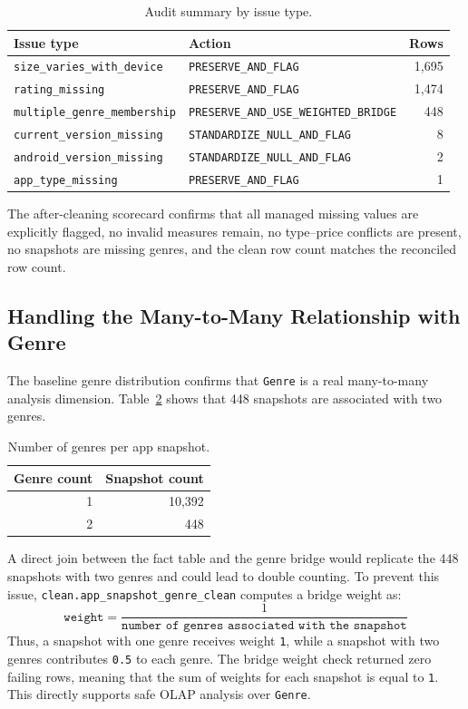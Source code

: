 \documentclass[11pt,a4paper]{article}
\begin{document}
\begin{table}[H]
\centering
\caption{Audit summary by issue type.}
\label{tab:audit_summary}
\begin{tabular}{@{}llr@{}}
\toprule
\textbf{Issue type} & \textbf{Action} & \textbf{Rows} \\
\midrule
\texttt{size\_varies\_with\_device} & \texttt{PRESERVE\_AND\_FLAG} & 1,695 \\
\texttt{rating\_missing} & \texttt{PRESERVE\_AND\_FLAG} & 1,474 \\
\texttt{multiple\_genre\_membership} & \texttt{PRESERVE\_AND\_USE\_WEIGHTED\_BRIDGE} & 448 \\
\texttt{current\_version\_missing} & \texttt{STANDARDIZE\_NULL\_AND\_FLAG} & 8 \\
\texttt{android\_version\_missing} & \texttt{STANDARDIZE\_NULL\_AND\_FLAG} & 2 \\
\texttt{app\_type\_missing} & \texttt{PRESERVE\_AND\_FLAG} & 1 \\
\bottomrule
\end{tabular}
\end{table}

The after-cleaning scorecard confirms that all managed missing values are explicitly flagged, no invalid measures remain, no type--price conflicts are present, no snapshots are missing genres, and the clean row count matches the reconciled row count.

\subsection{Handling the Many-to-Many Relationship with Genre}
The baseline genre distribution confirms that \texttt{Genre} is a real many-to-many analysis dimension. Table~\ref{tab:genre_distribution} shows that 448 snapshots are associated with two genres.

\begin{table}[H]
\centering
\caption{Number of genres per app snapshot.}
\label{tab:genre_distribution}
\begin{tabular}{@{}rr@{}}
\toprule
\textbf{Genre count} & \textbf{Snapshot count} \\
\midrule
1 & 10,392 \\
2 & 448 \\
\bottomrule
\end{tabular}
\end{table}

A direct join between the fact table and the genre bridge would replicate the 448 snapshots with two genres and could lead to double counting. To prevent this issue, \texttt{clean.app\_snapshot\_genre\_clean} computes a bridge weight as:
\[
\texttt{weight} = \frac{1}{\texttt{number of genres associated with the snapshot}}
\]
Thus, a snapshot with one genre receives weight \texttt{1}, while a snapshot with two genres contributes \texttt{0.5} to each genre. The bridge weight check returned zero failing rows, meaning that the sum of weights for each snapshot is equal to \texttt{1}. This directly supports safe OLAP analysis over \texttt{Genre}.
\end{document}
